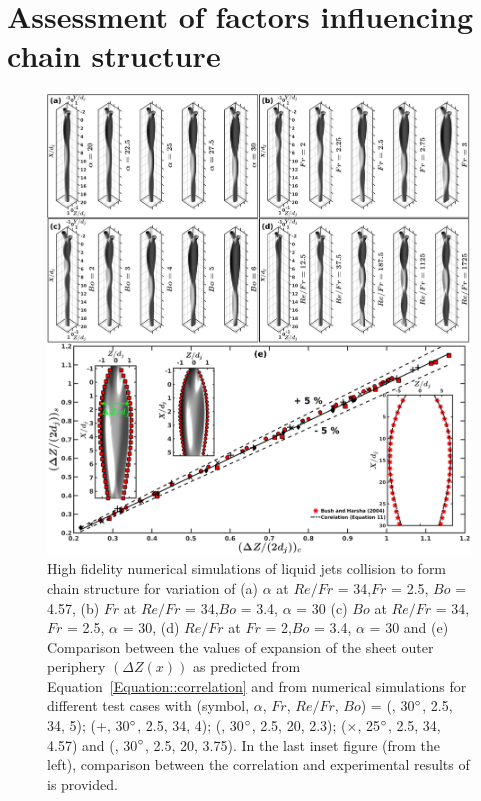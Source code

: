 \documentclass{jfm}
\begin{document}
\section{Assessment of factors influencing chain structure}
\begin{figure}
	\centering
	\includegraphics[width=\linewidth]{Figure6}
	\caption{High fidelity numerical simulations of liquid jets collision to form chain structure for variation of (a) $\alpha$ at $Re/Fr$ = 34,$Fr$ = 2.5, $Bo$ = 4.57, (b) $Fr$ at $Re/Fr$ = 34,$Bo$ = 3.4, $\alpha$ =  30 (c) $Bo$ at $Re/Fr$ = 34,$Fr$ = 2.5, $\alpha$ = 30, (d)  $Re/Fr$ at $Fr$ = 2,$Bo$ = 3.4, $\alpha$ = 30 and (e) Comparison between the values of expansion of the sheet outer periphery $\left(\Delta Z(x)\right)$ as predicted from Equation~\ref{Equation::correlation} and from numerical simulations for different test cases with (symbol, $\alpha$, $Fr$, $Re/Fr$, $Bo$) = (\protect\MarkerSquareRed, 30$\degree$, 2.5, 34, 5); (+, 30$\degree$, 2.5, 34, 4); (\protect \MarkerDiamondBlack, 30$\degree$, 2.5, 20, 2.3); ($\times$, 25$\degree$, 2.5, 34, 4.57) and (\protect \MarkerCircleRed, 30$\degree$, 2.5, 20, 3.75). In the last inset figure (from the left), comparison between the  correlation and experimental results of \cite{bush2004collision} is provided.  }
	\label{Figure::phaseContours}
\end{figure}
\end{document}
